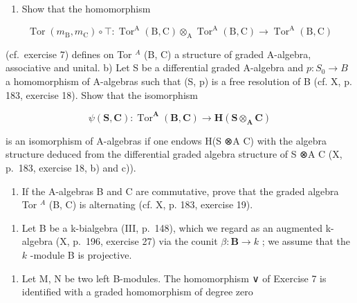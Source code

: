 \begin{enumerate}
\def\labelenumi{\alph{enumi})}
\tightlist
\item
  Show that the homomorphism
\end{enumerate}

\[
\operatorname{Tor} \left(m _ {\mathrm{B}}, m _ {\mathrm{C}}\right) \circ \top : \operatorname{Tor} ^ {\mathrm{A}} (\mathrm{B}, \mathrm{C}) \otimes_ {\mathrm{A}} \operatorname{Tor} ^ {\mathrm{A}} (\mathrm{B}, \mathrm{C}) \rightarrow \operatorname{Tor} ^ {\mathrm{A}} (\mathrm{B}, \mathrm{C})
\]

(cf.~exercise 7) defines on Tor \(^{A}\) (B, C) a structure of graded A-algebra, associative and unital. b) Let S be a differential graded A-algebra and \(p : S_{0} \to B\) a homomorphism of A-algebras such that (S, p) is a free resolution of B (cf. X, p. 183, exercise 18). Show that the isomorphism

\[
\psi (\mathbf {S}, \mathbf {C}): \operatorname{Tor} ^ {\mathbf {A}} (\mathbf {B}, \mathbf {C}) \rightarrow \mathbf {H} (\mathbf {S} \otimes_ {\mathbf {A}} \mathbf {C})
\]

is an isomorphism of A-algebras if one endows H(S ⊗A C) with the algebra structure deduced from the differential graded algebra structure of S ⊗A C (X, p.~183, exercise 18, b) and c)).

\begin{enumerate}
\def\labelenumi{\alph{enumi})}
\setcounter{enumi}{2}
\tightlist
\item
  If the A-algebras B and C are commutative, prove that the graded algebra Tor \(^{A}\) (B, C) is alternating (cf. X, p. 183, exercise 19).
\end{enumerate}

\begin{enumerate}
\def\labelenumi{\arabic{enumi})}
\setcounter{enumi}{9}
\tightlist
\item
  Let B be a k-bialgebra (III, p.~148), which we regard as an augmented k-algebra (X, p.~196, exercise 27) via the counit \(\beta: \mathbf{B} \to k\) ; we assume that the \(k\) -module B is projective.
\end{enumerate}

\begin{enumerate}
\def\labelenumi{\alph{enumi})}
\tightlist
\item
  Let M, N be two left B-modules. The homomorphism ∨ of Exercise 7 is identified with a graded homomorphism of degree zero
\end{enumerate}


